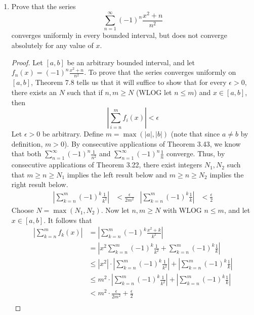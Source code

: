 \documentclass[../psets.tex]{subfiles}
\begin{document}
\begin{enumerate}[label={\textbf{\arabic*.}}]
\begin{proof}
        $M_n=1$ for all $n\in\N$.
    \end{proof}
    \item Prove that the series
    \begin{equation*}
        \sum_{n=1}^\infty(-1)^n\frac{x^2+n}{n^2}
    \end{equation*}
    converges uniformly in every bounded interval, but does not converge absolutely for any value of $x$.
    \begin{proof}
        Let $[a,b]$ be an arbitrary bounded interval, and let $f_n(x)=(-1)^n\tfrac{x^2+n}{n^2}$. To prove that the series converges uniformly on $[a,b]$, Theorem 7.8 tells us that it will suffice to show that for every $\epsilon>0$, there exists an $N$ such that if $n,m\geq N$ (WLOG let $n\leq m$) and $x\in[a,b]$, then
        \begin{equation*}
            \left| \sum_{i=n}^mf_i(x) \right| < \epsilon
        \end{equation*}
        Let $\epsilon>0$ be arbitrary. Define $m=\max(|a|,|b|)$ (note that since $a\neq b$ by definition, $m>0$). By consecutive applications of Theorem 3.43, we know that both $\sum_{n=1}^\infty(-1)^n\tfrac{1}{n^2}$ and $\sum_{n=1}^\infty(-1)^n\tfrac{1}{n}$ converge. Thus, by consecutive applications of Theorem 3.22, there exist integers $N_1,N_2$ such that $m\geq n\geq N_1$ implies the left result below and $m\geq n\geq N_2$ implies the right result below.
        \begin{align*}
            \left| \sum_{k=n}^m(-1)^k\frac{1}{k^2} \right| &< \frac{\epsilon}{2m^2}&
            \left| \sum_{k=n}^m(-1)^k\frac{1}{k} \right| &< \frac{\epsilon}{2}
        \end{align*}
        Choose $N=\max(N_1,N_2)$. Now let $n,m\geq N$ with WLOG $n\leq m$, and let $x\in[a,b]$. It follows that
        \begingroup
        \allowdisplaybreaks
        \begin{align*}
            \left| \sum_{k=n}^mf_k(x) \right| &= \left| \sum_{k=n}^m(-1)^k\frac{x^2+k}{k^2} \right|\\
            &= \left| x^2\sum_{k=n}^m(-1)^k\frac{1}{k^2}+\sum_{k=n}^m(-1)^k\frac{1}{k} \right|\\
            &\leq |x^2|\cdot\left| \sum_{k=n}^m(-1)^k\frac{1}{k^2} \right|+\left| \sum_{k=n}^m(-1)^k\frac{1}{k} \right|\\
            &\leq m^2\cdot\left| \sum_{k=n}^m(-1)^k\frac{1}{k^2} \right|+\left| \sum_{k=n}^m(-1)^k\frac{1}{k} \right|\\
            &< m^2\cdot\frac{\epsilon}{2m^2}+\frac{\epsilon}{2}\\

\end{align*}
\end{proof}
\end{enumerate}
\end{document}
